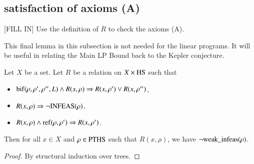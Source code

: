 \subsection{satisfaction of axioms (A)}

[FILL IN]  Use the definition of $R$ to check the axioms (A).



This final lemma in this subsection is not needed for the linear
programs. It will be useful in relating the Main LP Bound back to
the Kepler conjecture.

\begin{lemma}  Let $X$ be a set.  Let $R$ be a relation on
$X\times {\operatorname{HS}}$ such that
    \begin{itemize}
    \item ${\operatorname{bif}}(\rho,\rho',\rho'',L) \wedge R(x,\rho)\Rightarrow
      R(x,\rho') \vee R(x,\rho'')$,
    \item $R(x,\rho) \Rightarrow \neg {\operatorname{INFEAS}}(\rho)$,
    \item $R(x,\rho) \wedge {\operatorname{ref}}(\rho,\rho') \Rightarrow
    R(x,\rho')$.
    \end{itemize}
Then for all $x\in X$ and $\rho\in{\operatorname{PTHS}}$ such that
$R(x,\rho)$, we have $\neg {\operatorname{weak\_infeas}}(\rho)$.
\end{lemma}

\begin{proof} By structural induction over trees.
\end{proof}

